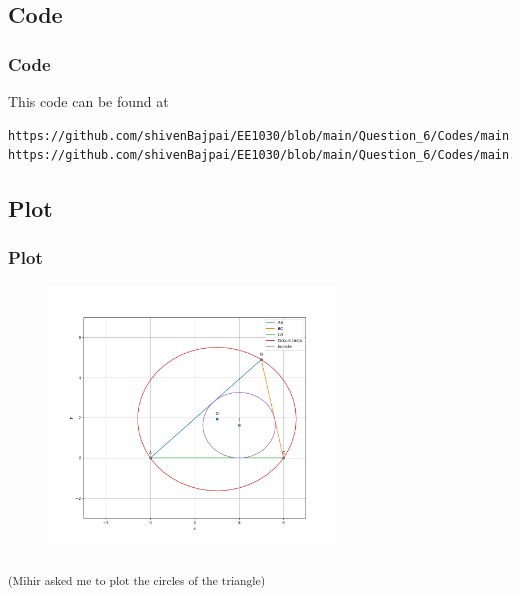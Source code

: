 \documentclass{beamer}
\theoremstyle{remark}
\numberwithin{equation}{section}
\begin{document}
\subsection{Code}
\begin{frame}
	\frametitle{Code}
	This code can be found at
	{\footnotesize
	\begin{lstlisting}
https://github.com/shivenBajpai/EE1030/blob/main/Question_6/Codes/main.c
https://github.com/shivenBajpai/EE1030/blob/main/Question_6/Codes/main.py
	\end{lstlisting}
	}

	

	
	
\end{frame}


\subsection{Plot}
\begin{frame}[fragile]
	\frametitle{Plot}

	\begin{figure}[H]
		\centering
		\includegraphics[width=0.675\textwidth]{figs/Figure.png}
	\end{figure}
	
	{\footnotesize
	\textsubscript{(Mihir asked me to plot the circles of the triangle)}}
\end{frame}
\end{document}
